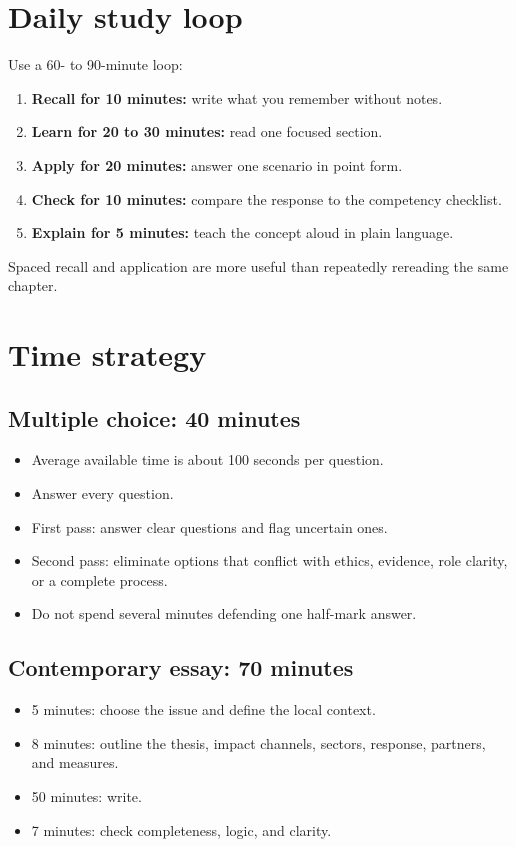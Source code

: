 \documentclass[11pt,letterpaper,oneside,openany]{book}
\begin{document}
\section[Daily study loop]{Daily study loop}
Use a 60- to 90-minute loop:


\begin{enumerate}
\item \textbf{Recall for 10 minutes:} write what you remember without notes.
\item \textbf{Learn for 20 to 30 minutes:} read one focused section.
\item \textbf{Apply for 20 minutes:} answer one scenario in point form.
\item \textbf{Check for 10 minutes:} compare the response to the competency checklist.
\item \textbf{Explain for 5 minutes:} teach the concept aloud in plain language.
\end{enumerate}


Spaced recall and application are more useful than repeatedly rereading the same chapter.


\section[Time strategy]{Time strategy}
\subsection[Multiple choice: 40 minutes]{Multiple choice: 40 minutes}
\begin{itemize}
\item Average available time is about 100 seconds per question.
\item Answer every question.
\item First pass: answer clear questions and flag uncertain ones.
\item Second pass: eliminate options that conflict with ethics, evidence, role clarity, or a complete process.
\item Do not spend several minutes defending one half-mark answer.
\end{itemize}


\subsection[Contemporary essay: 70 minutes]{Contemporary essay: 70 minutes}
\begin{itemize}
\item 5 minutes: choose the issue and define the local context.
\item 8 minutes: outline the thesis, impact channels, sectors, response, partners, and measures.
\item 50 minutes: write.
\item 7 minutes: check completeness, logic, and clarity.
\end{itemize}
\end{document}
